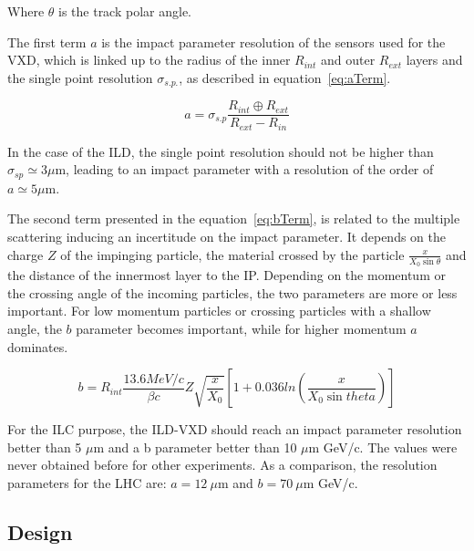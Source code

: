     Where $\theta$ is the track polar angle.

   The first term $a$ is the impact parameter resolution of the sensors used for the \gls{VXD}, which is linked up to the radius of the inner $R_{int}$ and outer $R_{ext}$ layers and the single point resolution $\sigma_{s.p.}$, as described in equation~\ref{eq:aTerm}.

   \begin{equation}
     a = \sigma_{s.p}\frac{R_{int} \oplus R_{ext}}{R_{ext} - R_{in}}
     \label{eq:aTerm}
   \end{equation}

    In the case of the \gls{ILD}, the single point resolution should not be higher than $\sigma_{sp} \simeq 3 \mu\text{m}$, leading to an impact parameter with a resolution of the order of $a \simeq 5 \mu\text{m}$.
   
    The second term presented in the equation~\ref{eq:bTerm}, is related to the multiple scattering inducing an incertitude on the impact parameter.
    It depends on the charge $Z$ of the impinging particle, the material crossed by the particle $\frac{x}{X_0 \sin{\theta}}$ and the distance of the innermost layer to the \gls{IP}.
    Depending on the momentum or the crossing angle of the incoming particles, the two parameters are more or less important.
    For low momentum particles or crossing particles with a shallow angle, the $b$ parameter becomes important, while for higher momentum $a$ dominates.


    \begin{equation}
      b = R_{int} \frac{13.6 MeV/c}{\beta c}  Z \sqrt{\frac{x}{X_{0}}} \left[ 1 + 0.036 ln \left( \frac{x}{X_{0}\sin{theta}} \right) \right]
      \label{eq:bTerm}
    \end{equation}
   
   For the \gls{ILC} purpose, the \gls{ILD}-\gls{VXD} should reach an impact parameter resolution better than 5 $\mu$m and a b parameter better than 10 $\mu$m GeV/c. 
   The values were never obtained before for other experiments. 
   As a comparison, the resolution parameters for the \gls{LHC} are: $a =  12 \ \mu$m and $b = 70 \ \mu$m GeV/c. 

   \subsection{Design}

